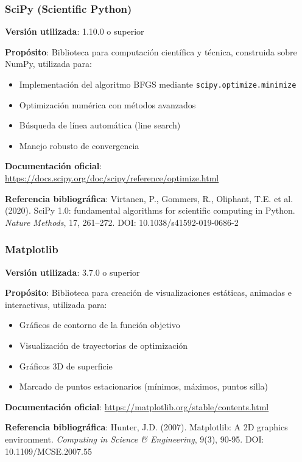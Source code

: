 \documentclass[12pt,a4paper]{article}
\begin{document}
\subsubsection*{SciPy (Scientific Python)}

\textbf{Versión utilizada}: 1.10.0 o superior

\textbf{Propósito}: Biblioteca para computación científica y técnica, construida sobre NumPy, utilizada para:
\begin{itemize}
    \item Implementación del algoritmo BFGS mediante \texttt{scipy.optimize.minimize}
    \item Optimización numérica con métodos avanzados
    \item Búsqueda de línea automática (line search)
    \item Manejo robusto de convergencia
\end{itemize}

\textbf{Documentación oficial}: \url{https://docs.scipy.org/doc/scipy/reference/optimize.html}

\textbf{Referencia bibliográfica}:
Virtanen, P., Gommers, R., Oliphant, T.E. et al. (2020). SciPy 1.0: fundamental algorithms for scientific computing in Python. \textit{Nature Methods}, 17, 261–272. DOI: 10.1038/s41592-019-0686-2

\subsubsection*{Matplotlib}

\textbf{Versión utilizada}: 3.7.0 o superior

\textbf{Propósito}: Biblioteca para creación de visualizaciones estáticas, animadas e interactivas, utilizada para:
\begin{itemize}
    \item Gráficos de contorno de la función objetivo
    \item Visualización de trayectorias de optimización
    \item Gráficos 3D de superficie
    \item Marcado de puntos estacionarios (mínimos, máximos, puntos silla)
\end{itemize}

\textbf{Documentación oficial}: \url{https://matplotlib.org/stable/contents.html}

\textbf{Referencia bibliográfica}:
Hunter, J.D. (2007). Matplotlib: A 2D graphics environment. \textit{Computing in Science \& Engineering}, 9(3), 90-95. DOI: 10.1109/MCSE.2007.55
\end{document}
